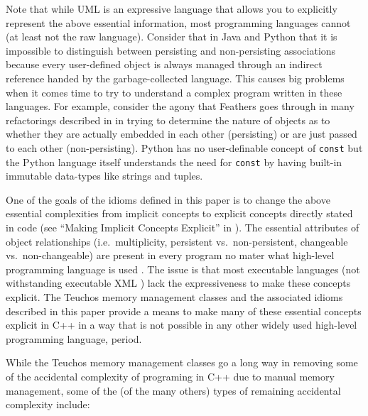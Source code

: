\documentclass[pdf,ps2pdf,11pt]{SANDreport}
\begin{document}
Note that while UML is an expressive language that allows you to
explicitly represent the above essential information, most programming
languages cannot (at least not the raw language).  Consider that in
Java and Python that it is impossible to distinguish between
persisting and non-persisting associations because every user-defined
object is always managed through an indirect reference handed by the
garbage-collected language.  This causes big problems when it comes
time to try to understand a complex program written in these
languages.  For example, consider the agony that Feathers goes through
in many refactorings described in
{}\cite{WorkingEffectivelyWithLegacyCode05} in trying to determine the
nature of objects as to whether they are actually embedded in each
other (persisting) or are just passed to each other (non-persisting).
Python has no user-definable concept of {}\texttt{const} but the
Python language itself understands the need for {}\texttt{const} by
having built-in immutable data-types like strings and tuples.

One of the goals of the idioms defined in this paper is to change the
above essential complexities from implicit concepts to explicit
concepts directly stated in code (see ``Making Implicit Concepts
Explicit'' in {}\cite[Chapter 9]{DomainDrivenDesign}).  The essential
attributes of object relationships (i.e.\ multiplicity, persistent
vs.\ non-persistent, changeable vs.\ non-changeable) are present in
every program no mater what high-level programming language is used
{}\cite{MythicalManMonth95, CodeComplete2nd04,
WorkingEffectivelyWithLegacyCode05}.  The issue is that most
executable languages (not withstanding executable XML {}\cite[Chapter
1]{UMLDistilledThirdEdition04}) lack the expressiveness to make these
concepts explicit.  The Teuchos memory management classes and the
associated idioms described in this paper provide a means to make many
of these essential concepts explicit in C++ in a way that is not
possible in any other widely used high-level programming language,
period.  

While the Teuchos memory management classes go a long way in
removing some of the accidental complexity of programing in C++ due to
manual memory management, some of the (of the many others) types of
remaining accidental complexity include:
\end{document}
